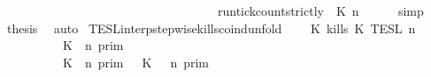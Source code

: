 \begin{isabellebody}
\ \ \ \ \ \ \ \ \ \ \ \ \ \ \ \ \ \ \ \ \ \ \ \ \ \ \ \ \ \ \ \ \ \ {\isasymle}\ {\isacharparenleft}run{\isacharunderscore}tick{\isacharunderscore}count{\isacharunderscore}strictly\ {\isasymrho}\ K\ n{\isacharparenright}{\isacartoucheclose}{\isacharbrackright}\isanewline
\ \ \ \ \isamarkupfalse%
\ simp\isanewline
\ \ \isamarkupfalse%
\ {\isacharquery}thesis\ \isamarkupfalse%
\ auto\isanewline
{}\isamarkupfalse%
%
\endisatagproof
{\isafoldproof}%
%
\isadelimproof
\isanewline
%
\endisadelimproof
\isanewline
{}\isamarkupfalse%
\ TESL{\isacharunderscore}interp{\isacharunderscore}stepwise{\isacharunderscore}kills{\isacharunderscore}coind{\isacharunderscore}unfold{\isacharcolon}\isanewline
\ \ \ {\isacartoucheopen}{\isasymlbrakk}\ K\ kills\ K\ {\isasymrbrakk}\isactrlsub T\isactrlsub E\isactrlsub S\isactrlsub L\isactrlbsup {\isasymge}\ n\isactrlesup \ {\isacharequal}\isanewline
\ \ \ \ \ \ {\isacharparenleft}\ \ \ {\isasymlbrakk}\ K\ {\isasymnot}{\isasymUp}\ n\ {\isasymrbrakk}\isactrlsub p\isactrlsub r\isactrlsub i\isactrlsub m\ \ \ \ \ \ \ \ \ \ \ \ \ \ \ \ \ \ \ \ \ \ \ \ %
\isanewline
\ \ \ \ \ \ \ \ {\isasymunion}\ {\isasymlbrakk}\ K\ {\isasymUp}\ n\ {\isasymrbrakk}\isactrlsub p\isactrlsub r\isactrlsub i\isactrlsub m\ {\isasyminter}\ {\isasymlbrakk}\ K\ {\isasymnot}{\isasymUp}\ {\isasymge}\ n\ {\isasymrbrakk}\isactrlsub p\isactrlsub r\isactrlsub i\isactrlsub m{\isacharparenright}\ \ \ \ %
\end{isabellebody}
